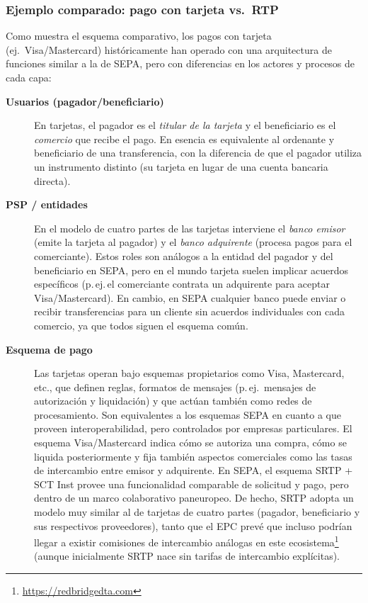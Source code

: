 \subsubsection*{Ejemplo comparado: pago con tarjeta vs.\ RTP}

Como muestra el esquema comparativo, los pagos con tarjeta (ej.\ Visa/Mastercard) históricamente han operado con una arquitectura de funciones similar a la de SEPA, pero con diferencias en los actores y procesos de cada capa:

\begin{description}
  \item[\textbf{Usuarios (pagador/beneficiario)}]
    En tarjetas, el pagador es el \emph{titular de la tarjeta} y el beneficiario es el \emph{comercio} que recibe el pago. En esencia es equivalente al ordenante y beneficiario de una transferencia, con la diferencia de que el pagador utiliza un instrumento distinto (su tarjeta en lugar de una cuenta bancaria directa).

  \item[\textbf{PSP / entidades}]
    En el modelo de cuatro partes de las tarjetas interviene el \emph{banco emisor} (emite la tarjeta al pagador) y el \emph{banco adquirente} (procesa pagos para el comerciante). Estos roles son análogos a la entidad del pagador y del beneficiario en SEPA, pero en el mundo tarjeta suelen implicar acuerdos específicos (p.\,ej.\,el comerciante contrata un adquirente para aceptar Visa/Mastercard). En cambio, en SEPA cualquier banco puede enviar o recibir transferencias para un cliente sin acuerdos individuales con cada comercio, ya que todos siguen el esquema común.

  \item[\textbf{Esquema de pago}]
    Las tarjetas operan bajo esquemas propietarios como Visa, Mastercard, etc., que definen reglas, formatos de mensajes (p.\,ej.\ mensajes de autorización y liquidación) y que actúan también como redes de procesamiento. Son equivalentes a los esquemas SEPA en cuanto a que proveen interoperabilidad, pero controlados por empresas particulares. El esquema Visa/Mastercard indica cómo se autoriza una compra, cómo se liquida posteriormente y fija también aspectos comerciales como las tasas de intercambio entre emisor y adquirente. En SEPA, el esquema SRTP + SCT Inst provee una funcionalidad comparable de solicitud y pago, pero dentro de un marco colaborativo paneuropeo. De hecho, SRTP adopta un modelo muy similar al de tarjetas de cuatro partes (pagador, beneficiario y sus respectivos proveedores), tanto que el EPC prevé que incluso podrían llegar a existir comisiones de intercambio análogas en este ecosistema\footnote{\url{https://redbridgedta.com}} (aunque inicialmente SRTP nace sin tarifas de intercambio explícitas).


\end{description}
